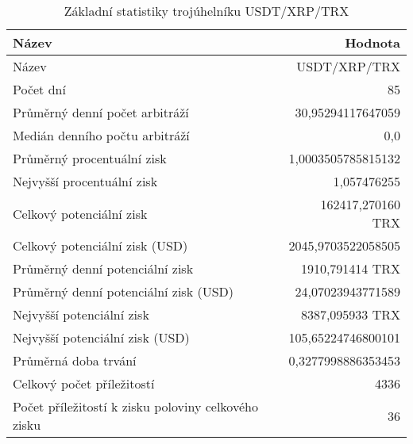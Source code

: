 \begin{table}\centering
\caption{Základní statistiky trojúhelníku USDT/XRP/TRX}
\label{USDTXRPTRX_stats}
\begin{tabular}{|| l | r ||}
\hline Název & Hodnota \\ 
\hline\hline Název & USDT/XRP/TRX \\ 
\hline Počet dní & 85 \\ 
\hline Průměrný denní počet arbitráží & 30,95294117647059 \\ 
\hline Medián denního počtu arbitráží & 0,0 \\ 
\hline Průměrný procentuální zisk & 1,0003505785815132 \\ 
\hline Nejvyšší procentuální zisk & 1,057476255 \\ 
\hline Celkový potenciální zisk & 162417,270160 TRX \\ 
\hline Celkový potenciální zisk (USD) & 2045,9703522058505 \\ 
\hline Průměrný denní potenciální zisk & 1910,791414 TRX \\ 
\hline Průměrný denní potenciální zisk (USD) & 24,07023943771589 \\ 
\hline Nejvyšší potenciální zisk & 8387,095933 TRX \\ 
\hline Nejvyšší potenciální zisk (USD) & 105,65224746800101 \\ 
\hline Průměrná doba trvání & 0,3277998886353453 \\ 
\hline Celkový počet příležitostí & 4336 \\ 
\hline Počet příležitostí k zisku poloviny celkového zisku & 36 \\ 
\hline
\end{tabular}
\end{table}